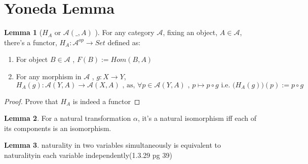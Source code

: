 \documentclass[18pt,a4paper]{article}
\theoremstyle{definition}
\newtheorem{lmma}{Lemma}[section]
\begin{document}
\section{Yoneda Lemma} %

\begin{lmma}[$H_A$ or $\mathcal{A} (\_,A)$ ] %
	For any category $\mathcal{A}$, fixing an object, $A \in \mathcal{A} $,\\
	there's a functor, $H_A: \mathcal{A} ^{op} \rightarrow Set$ defined as:
	\begin{enumerate}[label=\roman*]
		\item For object $B \in \mathcal{A} $ , $F(B):=Hom(B,A)$
		\item For any morphism in $\mathcal{A} $ , $g : X \rightarrow Y $,\\
			\[H_A(g): \mathcal{A} (Y,A) \rightarrow \mathcal{A}(X,A)
				\text{ , as, } \forall p \in \mathcal{A}(Y,A) \text{ , }
			p \mapsto p \circ g \text{ i.e. } \Big( H_A(g) \Big) (p) := p \circ g \]
	\end{enumerate}
\end{lmma}
\begin{proof}
	Prove that $H_A$ is indeed a functor

\end{proof}

\begin{lmma}
	For a natural transformation $\alpha$, it's a natural isomorphism iff
	each of its components is an isomorphism.
\end{lmma}

\begin{lmma}
	naturality in two variables simultaneously is equivalent to
	naturalityin each variable independently(1.3.29 pg 39)
\end{lmma}
\end{document}
